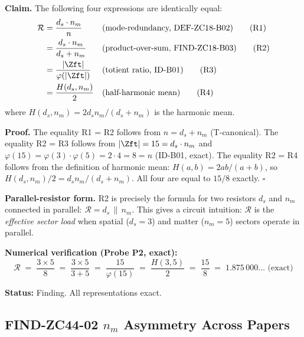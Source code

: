 \documentclass[12pt, a4paper]{article}
\providecommand{\nm}{n_m}
\providecommand{\ds}{d_s}
\providecommand{\phitot}{\varphi}
\providecommand{\Rcal}{\mathcal{R}}
\begin{document}
\begin{formalbox}[title={FIND-ZC44-01: $\mathcal{R} = 15/8$
  --- Four Exact Representations (Exact)}]
\textbf{Claim.}
The following four expressions are identically equal:
\begin{align}
  \Rcal
  &= \frac{\ds \cdot \nm}{n}
  && \text{(mode-redundancy, DEF-ZC18-B02)}
  \tag{R1}\label{eq:R1}\\
  &= \frac{\ds \cdot \nm}{\ds + \nm}
  && \text{(product-over-sum, FIND-ZC18-B03)}
  \tag{R2}\label{eq:R2}\\
  &= \frac{|\Zft|}{\phitot(|\Zft|)}
  && \text{(totient ratio, ID-B01)}
  \tag{R3}\label{eq:R3}\\
  &= \frac{H(\ds, \nm)}{2}
  && \text{(half-harmonic mean)}
  \tag{R4}\label{eq:R4}
\end{align}
where $H(\ds, \nm) = 2\ds\nm/(\ds + \nm)$ is the harmonic mean.

\textbf{Proof.}
The equality R1 = R2 follows from $n = \ds + \nm$ (T-canonical).
The equality R2 = R3 follows from $|\Zft| = 15 = \ds\cdot\nm$
and $\phitot(15) = \phitot(3)\cdot\phitot(5) = 2\cdot 4 = 8 = n$
(ID-B01, exact).
The equality R2 = R4 follows from the definition of
harmonic mean: $H(a,b) = 2ab/(a+b)$, so $H(\ds,\nm)/2 =
\ds\nm/(\ds+\nm)$.
All four are equal to $15/8$ exactly.
\hfill$\square$

\textbf{Parallel-resistor form.}
R2 is precisely the formula for two resistors $\ds$ and $\nm$
connected in parallel: $\Rcal = \ds \,\|\, \nm$.
This gives a circuit intuition: $\Rcal$ is the
\emph{effective sector load} when spatial ($\ds = 3$) and
matter ($\nm = 5$) sectors operate in parallel.

\textbf{Numerical verification (Probe P2, exact):}
\[
  \Rcal \;=\; \frac{3\times 5}{8}
  \;=\; \frac{3\times 5}{3+5}
  \;=\; \frac{15}{\phitot(15)}
  \;=\; \frac{H(3,5)}{2}
  \;=\; \frac{15}{8}
  \;=\; 1.875\,000\ldots\text{ (exact)}
\]

\textbf{Status:} Finding. All representations exact.
\end{formalbox}

\subsection{FIND-ZC44-02 \quad \texorpdfstring{$n_m$}{nm} Asymmetry Across Papers}

\end{document}
